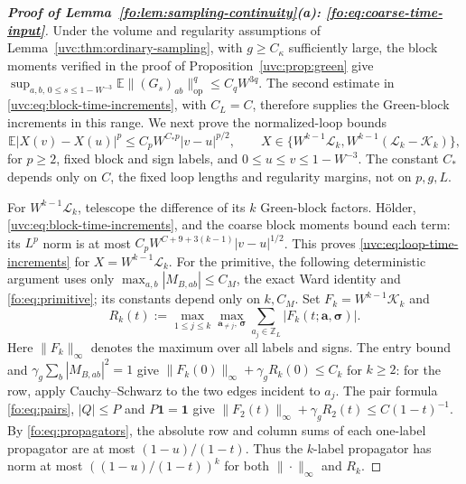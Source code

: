 \documentclass[11pt]{article}
\numberwithin{equation}{section}
\theoremstyle{remark}
\newcommand{\E}{\mathbb E}
\newcommand{\Z}{\mathbb Z}
\newcommand{\cL}{\mathcal L}
\newcommand{\cK}{\mathcal K}
\newcommand{\op}{\mathrm{op}}
\begin{document}
\begin{proof}[\textbf{Proof of Lemma~\ref{fo:lem:sampling-continuity}(a): \eqref{fo:eq:coarse-time-input}}]
Under the volume and regularity assumptions of
Lemma~\ref{uvc:thm:ordinary-sampling}, with $g\ge C_\kappa$ sufficiently large,
the block moments verified in the proof of
Proposition~\ref{uvc:prop:green} give
$\sup_{a,b,\,0\le s\le1-W^{-3}}\E\|(G_s)_{ab}\|_{\op}^q\le C_qW^{3q}$.
The second estimate in \eqref{uvc:eq:block-time-increments}, with $C_L=C$,
therefore supplies the Green-block increments in this range.
We next prove the normalized-loop bounds
\begin{equation}\label{uvc:eq:loop-time-increments}
 \E|X(v)-X(u)|^p\le C_pW^{C_*p}|v-u|^{p/2},\qquad
 X\in\{W^{k-1}\cL_k,W^{k-1}(\cL_k-\cK_k)\},
\end{equation}
for $p\ge2$, fixed block and sign labels, and
$0\le u\le v\le1-W^{-3}$. The constant $C_*$ depends only on $C$, the fixed loop
lengths and regularity margins, not on $p,g,L$.

For $W^{k-1}\cL_k$, telescope the difference of its $k$ Green-block factors.
H\"older, \eqref{uvc:eq:block-time-increments}, and the coarse block
moments bound each term: its $L^p$ norm is at most
$C_pW^{C+9+3(k-1)}|v-u|^{1/2}$. This proves
\eqref{uvc:eq:loop-time-increments} for $X=W^{k-1}\cL_k$.
For the primitive, the following deterministic argument uses only
$\max_{a,b}|M_{B,ab}|\le C_M$, the exact Ward identity and
\eqref{fo:eq:primitive}; its constants depend only on $k,C_M$.
Set $F_k=W^{k-1}\cK_k$ and
\[
 R_k(t):=\max_{1\le j\le k}\max_{\boldsymbol a_{\ne j},\,\boldsymbol\sigma}
                  \sum_{a_j\in\Z_L}|F_k(t;\boldsymbol a,\boldsymbol\sigma)|.
\]
Here $\|F_k\|_\infty$ denotes the maximum over all labels and signs.
The entry bound and
$\gamma_g\sum_b|M_{B,ab}|^2=1$ give
$\|F_k(0)\|_\infty+\gamma_gR_k(0)\le C_k$ for $k\ge2$:
for the row, apply Cauchy--Schwarz to the two edges incident to $a_j$.
The pair formula \eqref{fo:eq:pairs}, $|Q|\le P$ and $P\mathbf1=\mathbf1$
give $\|F_2(t)\|_\infty+\gamma_gR_2(t)\le C(1-t)^{-1}$.
By \eqref{fo:eq:propagators}, the absolute row and column sums of each
one-label propagator are at most $(1-u)/(1-t)$.
Thus the $k$-label propagator has norm at most
$((1-u)/(1-t))^k$ for both $\|\cdot\|_\infty$ and $R_k$.


\end{proof}
\end{document}
